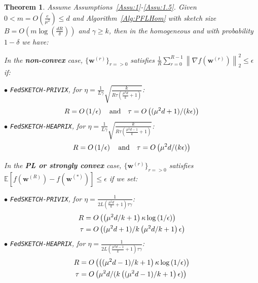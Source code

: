 \documentclass[twoside]{article}
\newtheorem{theorem}{Theorem}
\begin{document}
\begin{theorem}\label{thm:homog_case}
Assume Assumptions~\ref{Assu:1}-\ref{Assu:1.5}. 
Given $0<m=O\left(\frac{e}{\mu^2}\right)\leq d$ and Algorithm~\ref{Alg:PFLHom} with sketch size $B=O\left(m\log\left(\frac{d R}{\delta}\right)\right)$ and $\gamma\geq k$, then in the homogeneous and with probability $1-\delta$ we have:

In the \textbf{non-convex} case, $\{ {\boldsymbol{w}}^{(r)}\}_{r=>0}$ satisfies  $\frac{1}{R}\sum_{r=0}^{R-1}\left\|\nabla f({\boldsymbol{w}}^{(r)})\right\|_2^2\leq {\epsilon}$ if: 
 
\noindent $\bullet$ \texttt{FedSKETCH-PRIVIX}, for $\eta=\frac{1}{L\gamma}\sqrt{\frac{k}{R\tau\left(\frac{\mu^2d}{k}+1\right)}}$:    
\begin{equation}\notag
R=O\left(1/\epsilon\right) \quad \textrm{and} \quad \tau=O\left((\mu^2d+1)/(k\epsilon)\right)
 \end{equation}
\noindent $\bullet$ \texttt{FedSKETCH-HEAPRIX}, for $\eta=\frac{1}{L\gamma}\sqrt{\frac{k}{R\tau\left(\frac{\mu^2d-1}{k}+1\right)}}$:
\begin{equation}\notag
R=O\left(1/\epsilon\right) \quad \textrm{and} \quad \tau=O\left(\mu^2d/(k\epsilon)\right)
 \end{equation}

 
In the \textbf{PL or strongly convex} case, $\{ {\boldsymbol{w}}^{(r)}\}_{r=>0}$ satisfies $\mathbb{E}[f({\boldsymbol{w}}^{(R)})-f({\boldsymbol{w}}^{(*)})]\leq \epsilon$ if  we set:  

\noindent $\bullet$ \texttt{FedSKETCH-PRIVIX}, for $\eta=\frac{1}{2L\left(\frac{\mu^2d}{k}+1\right)\tau\gamma}$:    
\begin{equation}\notag
\begin{split}
R&=O\left(\left(\mu^2d/k+1\right)\kappa\log\left(1/\epsilon\right)\right)\\
\tau&=O\left((\mu^2d+1)/k\left(\mu^2d/k+1\right)\epsilon\right)
  \end{split}
 \end{equation}
\noindent $\bullet$ \texttt{FedSKETCH-HEAPRIX}, for $\eta=\frac{1}{2L\left(\frac{\mu^2d-1}{k}+1\right)\tau\gamma}$:
\begin{equation}\notag
\begin{split}
R& = O\left(\left((\mu^2d-1)/k+1\right)\kappa\log\left(1/\epsilon\right)\right)\\
 \tau &=O\left(\mu^2d/(k\left((\mu^2d-1)/k+1\right)\epsilon)\right)
  \end{split}
 \end{equation}


\end{theorem}
\end{document}
